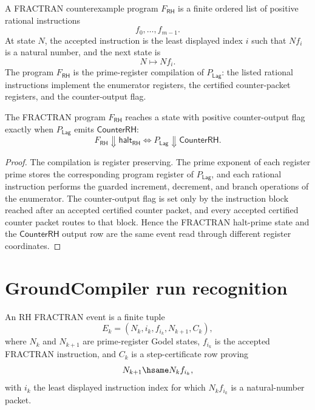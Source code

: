 \begin{definition}
\label{def:rh-fractran-counterexample-program}
A FRACTRAN counterexample program $F_{\mathsf{RH}}$ is a finite ordered
list of positive rational instructions
$$
f_0,\ldots,f_{m-1}.
$$
At state $N$, the accepted instruction is the least displayed index $i$
such that $Nf_i$ is a natural number, and the next state is
$$
N\mapsto Nf_i.
$$
The program $F_{\mathsf{RH}}$ is the prime-register compilation of
$P_{\mathsf{Lag}}$: the listed rational instructions implement the
enumerator registers, the certified counter-packet registers, and the
counter-output flag.
\end{definition}

\begin{proposition}
\label{prop:rh-fractran-preserves-counter-output}
The FRACTRAN program $F_{\mathsf{RH}}$ reaches a state with positive
counter-output flag exactly when $P_{\mathsf{Lag}}$ emits
$\mathsf{CounterRH}$:
$$
F_{\mathsf{RH}}\Downarrow\mathsf{halt}_{\mathsf{RH}}
\Longleftrightarrow
P_{\mathsf{Lag}}\Downarrow\mathsf{CounterRH}.
$$
\end{proposition}

\begin{proof}
The compilation is register preserving.  The prime exponent of each
register prime stores the corresponding program register of
$P_{\mathsf{Lag}}$, and each rational instruction performs the guarded
increment, decrement, and branch operations of the enumerator.  The
counter-output flag is set only by the instruction block reached after an
accepted certified counter packet, and every accepted certified counter packet
routes to that block.  Hence the FRACTRAN halt-prime state and the
$\mathsf{CounterRH}$ output row are the same event read through different
register coordinates.
\end{proof}

\section{GroundCompiler run recognition}
\label{sec:rh-counterprogram-groundcompiler-recognition}

\begin{definition}
\label{def:rh-fractran-event}
An RH FRACTRAN event is a finite tuple
$$
E_k=(N_k,i_k,f_{i_k},N_{k+1},C_k),
$$
where $N_k$ and $N_{k+1}$ are prime-register Godel states,
$f_{i_k}$ is the accepted FRACTRAN instruction, and $C_k$ is a
step-certificate row proving
$$
N_{k+1}\hsame N_k f_{i_k},
$$
with $i_k$ the least displayed instruction index for which
$N_k f_{i_k}$ is a natural-number packet.
\end{definition}

